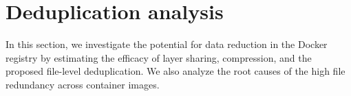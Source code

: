 \section{Deduplication analysis}
\label{sec:redundant_files}

In this section, we investigate the potential for data reduction in the
Docker registry by estimating the efficacy of layer sharing,
compression, and the proposed file-level deduplication.
%
We also analyze the root causes of the high file redundancy
across container images.
%
%
%
%
%
%
%
%




